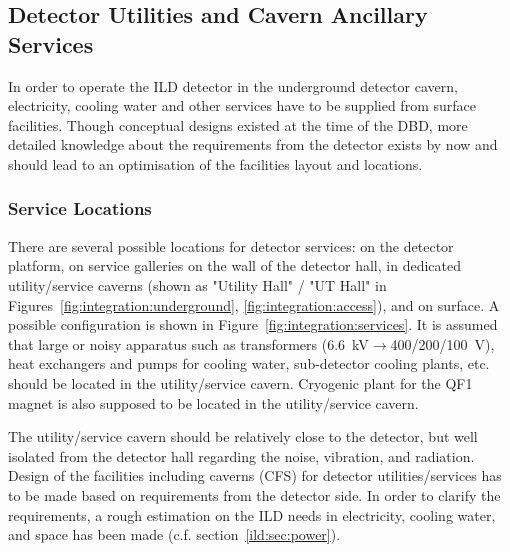 \subsection{Detector Utilities and Cavern Ancillary Services}


In order to operate the ILD detector in the underground detector cavern, electricity, cooling water and other services have to be supplied from surface facilities. Though conceptual designs existed at the time of the DBD, more detailed knowledge about the requirements from the detector exists by now and should lead to an optimisation of the facilities layout and locations.


\subsubsection{Service Locations}
\label{ild:sec:service_locations}

There are several possible locations for detector services: on the detector platform, on service galleries on the wall of the detector hall, in dedicated utility/service caverns (shown as "Utility Hall" / "UT Hall" in Figures~\ref{fig:integration:underground}, \ref{fig:integration:access}), and on surface. A possible configuration is shown in Figure~\ref{fig:integration:services}.
It is assumed that large or noisy apparatus such as transformers (6.6~kV$\rightarrow$400/200/100~V), heat exchangers and pumps for cooling water, sub-detector cooling plants, etc. should be located in the utility/service cavern. Cryogenic plant for the QF1 magnet is also supposed to be located in the utility/service cavern.

The utility/service cavern should be relatively close to the detector, but well isolated from the detector hall  regarding the noise, vibration, and radiation. Design of the facilities including caverns (CFS) for detector utilities/services has to be made based on requirements from the detector side. In order to clarify the requirements, a rough estimation on the ILD needs in electricity, cooling water, and space has been made (c.f. section~\ref{ild:sec:power}). 

